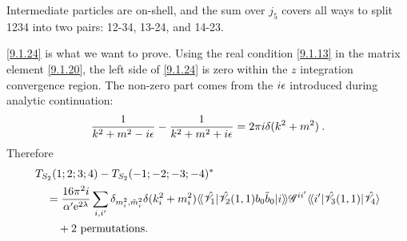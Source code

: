 Intermediate particles are on-shell, and the sum over $j_{5}$ covers all ways to split 1234 into two pairs: 12-34, 13-24, and 14-23.

\eqref{9.1.24} is what we want to prove. Using the real condition \eqref{9.1.13} in the matrix element \eqref{9.1.20}, the left side of \eqref{9.1.24} is zero within the $z$ integration convergence region.
The non-zero part comes from the $i \epsilon$ introduced during analytic continuation:
\begin{equation}
	\frac{1}{k^{2} + m^{2} - i \epsilon} - \frac{1}{k^{2}+m^{2}+ i \epsilon}=2 \pi i \delta(k^{2}+m^{2}) \:.
	\label{9.1.25}
\end{equation}
Therefore
\begin{align}
	& T_{S_{2}}(1; 2; 3; 4) - T_{S_{2}}(-1; -2; -3; -4)^{*} \nonumber \\
	&\quad =\frac{16 \pi^{2} i}{\alpha^{\prime} \mathrm{e}^{2 \lambda}} 
	\sum_{i, i^{\prime}} \delta_{m_{i}^{2}, \tilde{m}_{i}^{2}} \delta(k_{i}^{2}+m_{i}^{2})
	\langle\!\langle\hat{\mathscr{V}}_{1}|\hat{\mathscr{V}}_{2}(1,1) b_{0} \tilde{b}_{0}|
	i\rangle\!\rangle \mathscr{G}^{i i^{\prime}} 
	\langle\!\langle i^{\prime} |\hat{\mathscr{V}}_{3}(1,1)| \hat{\mathscr{V}}_{4}\rangle \nonumber \\
	&\qquad +\text{2 permutations.} \label{9.1.26}
\end{align}
